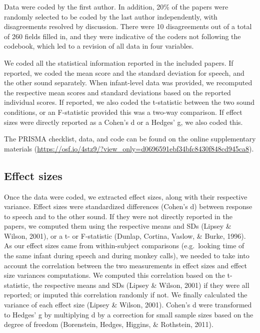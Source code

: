 \documentclass[man]{apa6}
\begin{document}
Data were coded by the first author. In addition, 20\% of the papers were randomly selected to be coded by the last author independently, with disagreements resolved by discussion. There were 10 disagreements out of a total of 260 fields filled in, and they were indicative of the coders not following the codebook, which led to a revision of all data in four variables.

We coded all the statistical information reported in the included papers. If reported, we coded the mean score and the standard deviation for speech, and the other sound separately. When infant-level data was provided, we recomputed the respective mean scores and standard deviations based on the reported individual scores. If reported, we also coded the t-statistic between the two sound conditions, or an F-statistic provided this was a two-way comparison. If effect sizes were directly reported as a Cohen's d or a Hedges' g, we also coded this.

The PRISMA checklist, data, and code can be found on the online supplementary materials (\url{https://osf.io/4stz9/?view_only=d0696591ebf34bfc8430f848cd945ca8}).

\hypertarget{effect-sizes}{%
\subsection{Effect sizes}\label{effect-sizes}}

Once the data were coded, we extracted effect sizes, along with their respective variance. Effect sizes were standardized differences (Cohen's d) between response to speech and to the other sound.
If they were not directly reported in the papers, we computed them using the respective means and SDs (Lipsey \& Wilson, 2001), or a t- or F-statistic (Dunlap, Cortina, Vaslow, \& Burke, 1996). As our effect sizes came from within-subject comparisons (e.g.~looking time of the same infant during speech and during monkey calls), we needed to take into account the correlation between the two measurements in effect sizes and effect size variances computations. We computed this correlation based on the t-statistic, the respective means and SDs (Lipsey \& Wilson, 2001) if they were all reported; or imputed this correlation randomly if not. We finally calculated the variance of each effect size (Lipsey \& Wilson, 2001). Cohen's d were transformed to Hedges' g by multiplying d by a correction for small sample sizes based on the degree of freedom (Borenstein, Hedges, Higgins, \& Rothstein, 2011).
\end{document}
